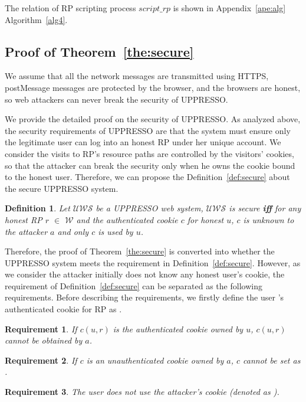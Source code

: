 \begin{appendices}
The relation of RP scripting process $script\_rp$ is shown in Appendix~\ref{ape:alg} Algorithm~\ref{alg4}.



\subsection{Proof of Theorem~\ref{the:secure}}


\newtheorem{redef}{Definition}
\newtheorem{req}{Requirement}
\newtheorem{relemma}{Lemma}

We assume that all the network messages are transmitted using HTTPS, postMessage messages are protected by the browser, and the browsers are  honest, so web attackers can never break the security of UPPRESSO.

We provide the detailed proof on the security of UPPRESSO. As analyzed above, the security requirements of UPPRESSO are that the system must ensure only the legitimate user can log into an honest RP under her unique account. We consider the visits to RP's resource paths are controlled by the visitors' cookies, so that the attacker can break the security only when he owns the cookie bound to the honest user. Therefore, we can propose the Definition~\ref{def:secure} about the secure UPPRESSO system.
\begin{redef}
Let $\mathcal{UWS}$ be a UPPRESSO web system, $\mathcal{UWS}$ is secure \textbf{iff} for any honest RP $r$ $\in $ $\mathcal{W}$ and  the authenticated cookie $c$ for honest $u$,  $c$ is unknown to the attacker $a$ and only $c$ is used by $u$.
\end{redef}
Therefore, the proof of Theorem~\ref{the:secure} is converted into whether the UPPRESSO system meets the requirement in Definition~\ref{def:secure}. However, as we consider the attacker initially does not know any honest user's cookie, the requirement of Definition~\ref{def:secure} can be separated as the following requirements. Before describing the requirements, we firstly define the user 's authenticated cookie for RP  as .
\begin{req}
If $c(u,r)$ is the authenticated cookie owned by $u$, $c(u,r)$ cannot be obtained by $a$.
\label{req:cookie1}
\end{req}
\begin{req}
If $c$ is an unauthenticated cookie owned by $a$, $c$ cannot be set as .
\label{req:cookie2}
\end{req}
\begin{req}
The user  does not use the attacker's cookie (denoted as ).
\label{req:cookie3}
\end{req}



\end{appendices}

